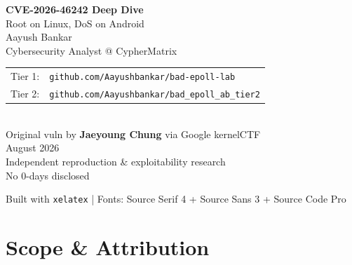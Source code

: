 \documentclass[11pt,a4paper]{article}
\begin{document}
\thispagestyle{empty}
\vspace*{4cm}
\begin{center}
  {\Huge\bfseries\color{fg} CVE-2026-46242 Deep Dive}\\[0.4em]
  {\Large\color{accent} Root on Linux, DoS on Android}\\[2.5em]
  
  {\large\color{fgmuted} Aayush Bankar}\\[0.3em]
  {\color{fgmuted} Cybersecurity Analyst @ CypherMatrix}\\[2em]
  
  \begin{tabular}{ll}
    \color{fgmuted}Tier 1: & \color{accent}\texttt{github.com/Aayushbankar/bad-epoll-lab} \\
    \color{fgmuted}Tier 2: & \color{accent2}\texttt{github.com/Aayushbankar/bad\_epoll\_ab\_tier2} \\
  \end{tabular}\\[2em]
  
  {\color{fgmuted} Original vuln by \textbf{Jaeyoung Chung} via Google kernelCTF}\\[2em]
  
  {\color{fgmuted} August 2026}\\[1em]
  {\color{fgmuted} Independent reproduction \& exploitability research}\\
  {\color{fgmuted} No 0-days disclosed}
\end{center}
\vfill
{\color{fgmuted}\footnotesize Built with \texttt{xelatex} | Fonts: Source Serif 4 + Source Sans 3 + Source Code Pro}

\newpage
\tableofcontents
\newpage

\section{Scope \& Attribution}
\end{document}
